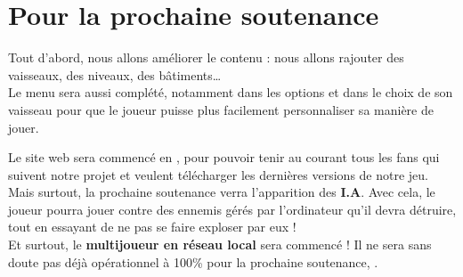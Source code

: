 \documentclass[10pt, titlepage]{report}
\begin{document}
\chapter{Pour la prochaine soutenance}

Tout d'abord, nous allons améliorer le contenu : nous allons rajouter des vaisseaux, des niveaux, des bâtiments\dots\\
Le menu sera aussi complété, notamment dans les options et dans le choix de son vaisseau pour que le joueur puisse plus facilement personnaliser sa manière de jouer.

Le site web sera commencé en , pour pouvoir tenir au courant tous les fans qui suivent notre projet et veulent télécharger les dernières versions de notre jeu.\\

Mais surtout, la prochaine soutenance verra l'apparition des \textbf{I.A}. Avec cela, le joueur pourra jouer contre des ennemis gérés par l'ordinateur qu'il devra détruire, tout en essayant de ne pas se faire exploser par eux !\\

 Et surtout, le \textbf{multijoueur en réseau local} sera commencé ! Il ne sera sans doute pas déjà opérationnel à 100\% pour la prochaine soutenance, .
\end{document}

